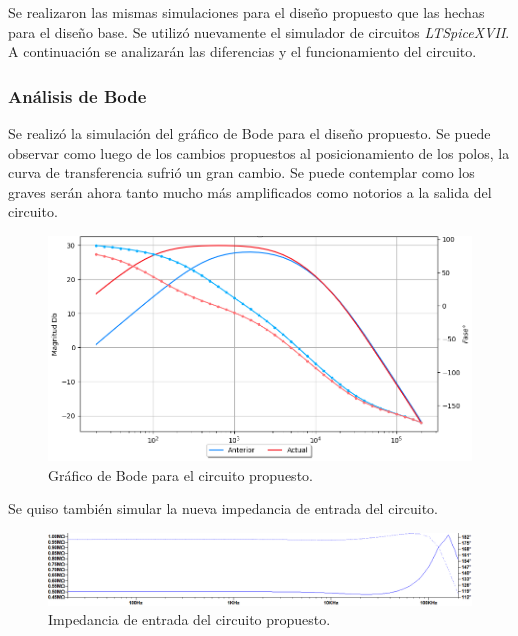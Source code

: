 Se realizaron las mismas simulaciones para el diseño propuesto que las hechas para el diseño base. Se utilizó nuevamente el simulador de circuitos \textit{LTSpiceXVII}. A continuación se analizarán las diferencias y el funcionamiento del circuito.

\subsubsection{Análisis de Bode}
Se realizó la simulación del gráfico de Bode para el diseño propuesto. Se puede observar como luego de los cambios propuestos al posicionamiento de los polos, la curva de transferencia sufrió un gran cambio. Se puede contemplar como los graves serán ahora tanto mucho más amplificados como notorios a la salida del circuito.
\begin{figure}[H]
	\centering
	\includegraphics[width=1\textwidth, trim={0 0 0 0}, clip]{Ejercicio5/Imagenes/Circuito_base/Sim/circuito_base_prop_bode.png}
	\caption{Gráfico de Bode para el circuito propuesto.}
	\label{fig:sim_prop_bode}
\end{figure}

Se quiso también simular la nueva impedancia de entrada del circuito.

\begin{center}
\begin{figure}[H]
	\hspace{-6em}
	\includegraphics[width=1.4\textwidth, trim={0 0 0 0}, clip]{Ejercicio5/Imagenes/Circuito_base/Sim/circuito_propuesto_zin.png}
	\caption{Impedancia de entrada del circuito propuesto.}
	\label{fig:sim_prop_zin}
\end{figure}
\end{center}

